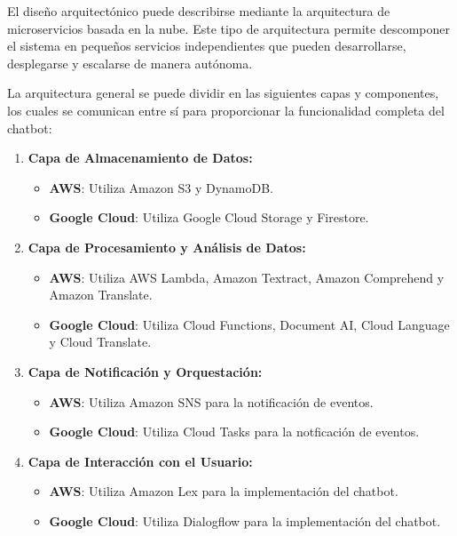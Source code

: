 El diseño arquitectónico puede describirse mediante la arquitectura de microservicios basada en la nube. Este tipo de arquitectura permite descomponer el sistema en pequeños servicios independientes que pueden desarrollarse, desplegarse y escalarse de manera autónoma. 

La arquitectura general se puede dividir en las siguientes capas y componentes, los cuales se comunican entre sí para proporcionar la funcionalidad completa del chatbot:

\begin{enumerate}
    \item \textbf{Capa de Almacenamiento de Datos:}
    \begin{itemize}
        \item \textbf{AWS}: Utiliza Amazon S3 y DynamoDB.
        \item \textbf{Google Cloud}: Utiliza Google Cloud Storage y Firestore.
    \end{itemize}
    
    \item \textbf{Capa de Procesamiento y Análisis de Datos:}
    \begin{itemize}
        \item \textbf{AWS}: Utiliza AWS Lambda, Amazon Textract, Amazon Comprehend y Amazon Translate.
        \item \textbf{Google Cloud}: Utiliza Cloud Functions, Document AI, Cloud Language y Cloud Translate.
    \end{itemize}
    
    \item \textbf{Capa de Notificación y Orquestación:}
    \begin{itemize}
        \item \textbf{AWS}: Utiliza Amazon SNS para la notificación de eventos.
        \item \textbf{Google Cloud}: Utiliza Cloud Tasks para la notficación de eventos.
    \end{itemize}
    
    \item \textbf{Capa de Interacción con el Usuario:}
    \begin{itemize}
        \item \textbf{AWS}: Utiliza Amazon Lex para la implementación del chatbot.
        \item \textbf{Google Cloud}: Utiliza Dialogflow para la implementación del chatbot.
    \end{itemize}
\end{enumerate}


